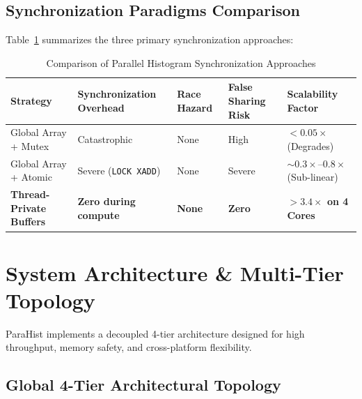 \documentclass[12pt,a4paper,oneside]{report}
\begin{document}
\section{Synchronization Paradigms Comparison}
Table~\ref{tab:sync_comparison} summarizes the three primary synchronization approaches:

\begin{table}[h!]
\centering
\caption{Comparison of Parallel Histogram Synchronization Approaches}
\label{tab:sync_comparison}
\begin{tabularx}{\textwidth}{lXXXl}
\toprule
\textbf{Strategy} & \textbf{Synchronization Overhead} & \textbf{Race Hazard} & \textbf{False Sharing Risk} & \textbf{Scalability Factor} \\
\midrule
Global Array + Mutex & Catastrophic & None & High & $<0.05\times$ (Degrades) \\
Global Array + Atomic & Severe (\texttt{LOCK XADD}) & None & Severe & $\sim 0.3\times$--$0.8\times$ (Sub-linear) \\
\textbf{Thread-Private Buffers} & \textbf{Zero during compute} & \textbf{None} & \textbf{Zero} & \textbf{$>3.4\times$ on 4 Cores} \\
\bottomrule
\end{tabularx}
\end{table}

\chapter{System Architecture \& Multi-Tier Topology}

ParaHist implements a decoupled 4-tier architecture designed for high throughput, memory safety, and cross-platform flexibility.

\section{Global 4-Tier Architectural Topology}
\end{document}
